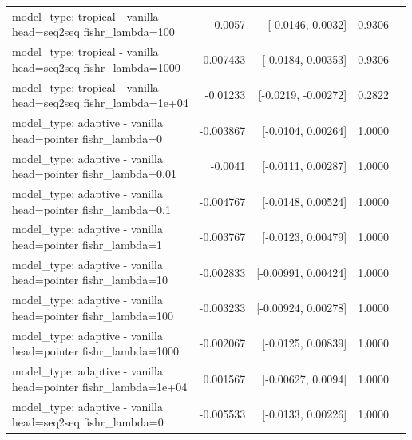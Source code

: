 \documentclass[10pt]{article}
\makeatletter
\newcommand{\stackcell}[1]{\begin{tabular}[t]{@{}l@{}}#1\end{tabular}}
\makeatother
\begin{document}
{\begin{longtable}{lrrrl}
\stackcell{model\_type: tropical - vanilla\\\footnotesize head=seq2seq fishr\_lambda=100 } & -0.0057 & [-0.0146, 0.0032] & 0.9306 & \\
\stackcell{model\_type: tropical - vanilla\\\footnotesize head=seq2seq fishr\_lambda=1000 } & -0.007433 & [-0.0184, 0.00353] & 0.9306 & \\
\stackcell{model\_type: tropical - vanilla\\\footnotesize head=seq2seq fishr\_lambda=1e+04 } & -0.01233 & [-0.0219, -0.00272] & 0.2822 & \\
\stackcell{model\_type: adaptive - vanilla\\\footnotesize head=pointer fishr\_lambda=0 } & -0.003867 & [-0.0104, 0.00264] & 1.0000 & \\
\stackcell{model\_type: adaptive - vanilla\\\footnotesize head=pointer fishr\_lambda=0.01 } & -0.0041 & [-0.0111, 0.00287] & 1.0000 & \\
\stackcell{model\_type: adaptive - vanilla\\\footnotesize head=pointer fishr\_lambda=0.1 } & -0.004767 & [-0.0148, 0.00524] & 1.0000 & \\
\stackcell{model\_type: adaptive - vanilla\\\footnotesize head=pointer fishr\_lambda=1 } & -0.003767 & [-0.0123, 0.00479] & 1.0000 & \\
\stackcell{model\_type: adaptive - vanilla\\\footnotesize head=pointer fishr\_lambda=10 } & -0.002833 & [-0.00991, 0.00424] & 1.0000 & \\
\stackcell{model\_type: adaptive - vanilla\\\footnotesize head=pointer fishr\_lambda=100 } & -0.003233 & [-0.00924, 0.00278] & 1.0000 & \\
\stackcell{model\_type: adaptive - vanilla\\\footnotesize head=pointer fishr\_lambda=1000 } & -0.002067 & [-0.0125, 0.00839] & 1.0000 & \\
\stackcell{model\_type: adaptive - vanilla\\\footnotesize head=pointer fishr\_lambda=1e+04 } & 0.001567 & [-0.00627, 0.0094] & 1.0000 & \\
\stackcell{model\_type: adaptive - vanilla\\\footnotesize head=seq2seq fishr\_lambda=0 } & -0.005533 & [-0.0133, 0.00226] & 1.0000 & \\

\end{longtable}}
\end{document}
